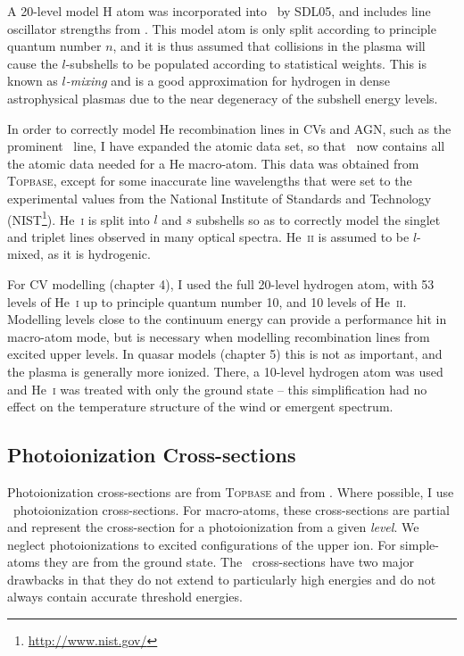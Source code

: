 A 20-level model H atom was incorporated into \py\ by SDL05,
and includes line oscillator strengths from \cite{menzel1935}.
This model atom is only split according to principle quantum number $n$,
and it is thus assumed that collisions in the plasma will cause 
the $l$-subshells to be populated according to statistical weights. 
This is known as {\em $l$-mixing} and is a good approximation for hydrogen in
dense astrophysical plasmas due to the near degeneracy of the subshell 
energy levels.

In order to correctly model He recombination lines in CVs and AGN, such as the 
prominent \heiiuv\ line, I have expanded the atomic data set, so that \py\
now contains all the atomic data needed for a He macro-atom. This data was 
obtained from \textsc{Topbase}, except for some inaccurate line wavelengths
that were set to the experimental values from the National 
Institute of Standards and Technology (NIST\footnote{\url{http://www.nist.gov/}}).
He~\textsc{i} is split into $l$ and $s$ subshells so as to correctly model the
singlet and triplet lines observed in many optical spectra. He~\textsc{ii} is assumed
to be $l$-mixed, as it is hydrogenic.

For CV modelling (chapter 4), I used the full 20-level hydrogen atom, with 53 levels of 
He~\textsc{i} up to principle quantum number 10, and 10 levels of He~\textsc{ii}. 
Modelling levels close to the continuum energy can
provide a performance hit in macro-atom mode, but is necessary
when modelling recombination lines from excited 
upper levels. In quasar models (chapter 5) 
this is not as important, and the
plasma is generally more ionized. There, a 10-level hydrogen atom was used and
He~\textsc{i} was treated with only the ground state -- this simplification
had no effect on the temperature structure of the wind or emergent spectrum.

\subsection{Photoionization Cross-sections}

Photoionization cross-sections are from \textsc{Topbase} \citep{cunto1993} and from 
\cite{vfky}.
Where possible, I use \top\ photoionization cross-sections. For macro-atoms,
these cross-sections are partial and represent the cross-section for a photoionization
from a given {\em level}. We neglect photoionizations to excited configurations
of the upper ion. For simple-atoms they are from the ground state.
The \top\ cross-sections have two major drawbacks in that they do not 
extend to particularly high energies and do not always contain accurate threshold
energies.

